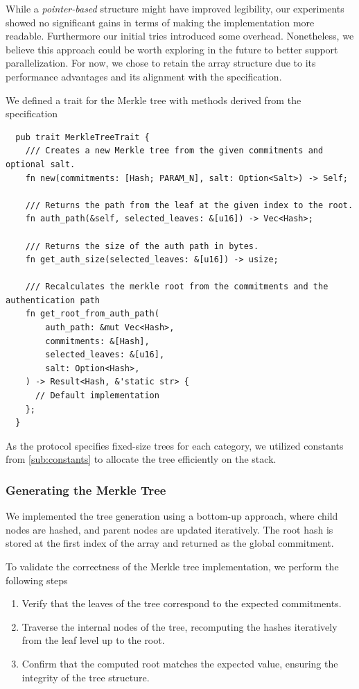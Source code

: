 \documentclass[11pt]{report}
\theoremstyle{definition}
\theoremstyle{plain}
\begin{document}
While a \textit{pointer-based} structure might have improved legibility, our experiments showed no significant gains in terms of making the implementation more readable. Furthermore our initial tries introduced some overhead. Nonetheless, we believe this approach could be worth exploring in the future to better support parallelization. For now, we chose to retain the array structure due to its performance advantages and its alignment with the specification.

We defined a trait for the Merkle tree with methods derived from the specification
\begin{verbatim}
  pub trait MerkleTreeTrait {
    /// Creates a new Merkle tree from the given commitments and optional salt.
    fn new(commitments: [Hash; PARAM_N], salt: Option<Salt>) -> Self;

    /// Returns the path from the leaf at the given index to the root.
    fn auth_path(&self, selected_leaves: &[u16]) -> Vec<Hash>;

    /// Returns the size of the auth path in bytes.
    fn get_auth_size(selected_leaves: &[u16]) -> usize;

    /// Recalculates the merkle root from the commitments and the authentication path
    fn get_root_from_auth_path(
        auth_path: &mut Vec<Hash>,
        commitments: &[Hash],
        selected_leaves: &[u16],
        salt: Option<Hash>,
    ) -> Result<Hash, &'static str> {
      // Default implementation
    };
  }
\end{verbatim}

As the protocol specifies fixed-size trees for each category, we utilized constants from \autoref{sub:constants} to allocate the tree efficiently on the stack.
\subsubsection{Generating the Merkle Tree}\label{sec:new}

We implemented the tree generation using a bottom-up approach, where child nodes are hashed, and parent nodes are updated iteratively. The root hash is stored at the first index of the array and returned as the global commitment.

To validate the correctness of the Merkle tree implementation, we perform the following steps

\begin{enumerate}[parsep=0pt, itemsep=0pt]
  \item Verify that the leaves of the tree correspond to the expected commitments.
  \item Traverse the internal nodes of the tree, recomputing the hashes iteratively from the leaf level up to the root.
  \item Confirm that the computed root matches the expected value, ensuring the integrity of the tree structure.
\end{enumerate}
\end{document}
